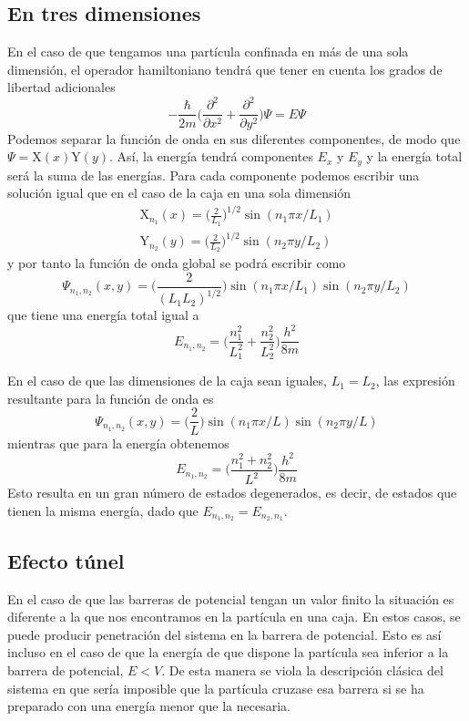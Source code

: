 \subsection{En tres dimensiones}
En el caso de que tengamos una partícula confinada
en más de una sola dimensión, el operador 
hamiltoniano tendrá que tener en cuenta los 
grados de libertad adicionales
\begin{equation}
    -\frac{\hbar}{2m}\bigg(\frac{\partial^2}{\partial x^2} + \frac{\partial^2}{\partial y^2}\bigg)\Psi= E\Psi
\end{equation}
Podemos separar la función de onda en sus diferentes
componentes, de modo que $\Psi=\mathrm{X}(x)\mathrm{Y}(y)$. Así, la 
energía tendrá componentes $E_x$ y $E_y$ y la
energía total será la suma de las energías.
Para cada componente podemos escribir una
solución igual que en el caso de la caja
en una sola dimensión
\begin{subequations}
    \begin{align}
        \mathrm{X}_{n_1}(x)=\bigg(\frac{2}{L_1}\bigg)^{1/2}\sin(n_1\pi x/L_1) \\
        \mathrm{Y}_{n_2}(y)=\bigg(\frac{2}{L_2}\bigg)^{1/2}\sin(n_2\pi y/L_2)
    \end{align}
\end{subequations}
y por tanto la función de onda global se podrá
escribir como
\begin{equation}
        \Psi_{n_1, n_2}(x,y)=\bigg(\frac{2}{(L_1L_2)^{1/2}}\bigg)\sin(n_1\pi x/L_1)\sin(n_2\pi y/L_2)
\end{equation}
que tiene una energía total igual a
\begin{equation}
    E_{n_1,n_2} =\bigg(\frac{n_1^2}{L_1^2} + \frac{n_2^2}{L_2^2}\bigg)\frac{h^2}{8m}
\end{equation}

En el caso de que las dimensiones de la caja
sean iguales, $L_1=L_2$, las expresión resultante
para la función de onda es
\begin{equation}
    \Psi_{n_1, n_2}(x,y)=\bigg(\frac{2}{L}\bigg)\sin(n_1\pi x/L)\sin(n_2\pi y/L)
\end{equation}
mientras que para la energía obtenemos
\begin{equation}
    E_{n_1,n_2}=\bigg(\frac{n_1^2+n_2^2}{L^2}\bigg)\frac{h^2}{8m}
\end{equation}
Esto resulta en un gran número de estados degenerados, 
es decir, de estados que tienen la misma energía,
dado que $E_{n_1,n_2}=E_{n_2,n_1}$.

\subsection{Efecto túnel}
En el caso de que las barreras de potencial tengan un 
valor finito la situación es diferente a la que nos
encontramos en la partícula en una caja. En estos casos,
se puede producir penetración del sistema en la barrera 
de potencial. Esto es así incluso en el caso de que la
energía de que dispone la partícula sea inferior a la
barrera de potencial, $E<V$. De esta manera se viola la
descripción clásica del sistema en que sería imposible
que la partícula cruzase esa barrera si se ha preparado
con una energía menor que la necesaria.

